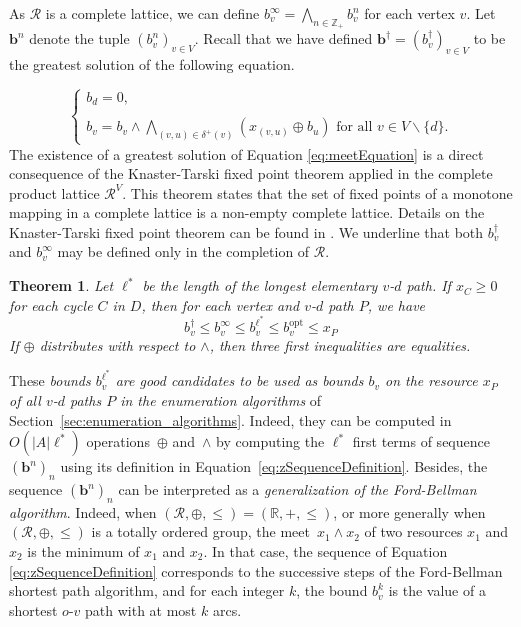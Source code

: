 \documentclass[11pt]{amsart}
\theoremstyle{plain}
\newtheorem{theo}{Theorem}
\theoremstyle{remark}
\newcommand{\rplus}{\oplus}
\newcommand{\rleq}{\leqslant}
\newcommand{\rgeq}{\geqslant}
\newcommand{\rset}{\mathcal{R}}
\newcommand{\re}{x}
\newcommand{\meet}{\wedge} \newcommand{\bigmeet}{\bigwedge}
\begin{document}
As $\rset$ is a complete lattice, we can define $b_{v}^{\infty} = \displaystyle \bigmeet_{n \in \mathbb{Z}_{+}}b_{v}^{n}$ for each vertex $v$. Let $\mathbf{b}^{n}$ denote the tuple $(b_{v}^{n})_{v\in V}$. Recall that we have defined $\mathbf{b^{\dagger}}= (b_{v}^{\dagger})_{v\in V}$ to be the greatest solution of the following equation.

\begin{equation}\label{eq:meetEquation}
	\left\{\begin{array}{l}
	b_{d} = 0, \\
\\
	b_{v} = \displaystyle b_{v}\meet \bigmeet_{(v,u)\in \delta^{+}(v)}(\re_{(v,u)} \rplus b_{u}) \text{ for all } v\in V\backslash \{d\}.
	\end{array}
	\right.
\end{equation}
\noindent The existence of a greatest solution of Equation \eqref{eq:meetEquation} is a direct consequence of the Knaster-Tarski fixed point theorem applied in the complete product lattice $\rset^{V}$. This theorem states that the set of fixed points of a monotone mapping in a complete lattice is a non-empty complete lattice. Details on the Knaster-Tarski fixed point theorem can be found in \cite{davey2002introduction}. We underline that both $b_{v}^{\dagger}$ and $b_{v}^{\infty}$ may be defined only in the completion of $\rset$.  


\begin{theo}\label{theo:relationsBetweenBounds}
Let $\ell^{*}$ be the length of the longest elementary $v$-$d$ path. If $\re_{C} \rgeq 0$ for each cycle $C$ in $D$, then for each vertex and $v$-$d$ path $P$, we have
\begin{equation}\label{eq:relationsBetweenBounds}
	b_{v}^{\dagger} \rleq b_{v}^{\infty} \rleq b_{v}^{\ell^{*}} \rleq b_{v}^{\mathrm{opt}} \rleq \re_{P}
\end{equation}
If $\rplus$ distributes with respect to $\meet$,  then three first inequalities are equalities.
\end{theo}

These \emph{bounds $b_{v}^{\ell^{*}}$ are good candidates to be used as bounds $b_{v}$ on the resource $\re_{P}$ of all $v$-$d$ paths $P$ in the enumeration algorithms }of Section~\ref{sec:enumeration_algorithms}. Indeed, they can be computed in $O(|A|\ell^{*})$ operations~$\rplus$ and~$\meet$ by computing the $\ell^{*}$ first terms of sequence $\left(\mathbf{b}^{n}\right)_{n}$ using its definition in Equation~\eqref{eq:zSequenceDefinition}. Besides, the sequence $\left(\mathbf{b}^{n}\right)_{n}$ can be interpreted as a \emph{generalization of the Ford-Bellman algorithm}. Indeed, when $(\rset, \rplus, \rleq) = (\mathbb{R}, +, \leq)$, or more generally when $(\rset, \rplus, \rleq) $ is a totally ordered group, the meet~$\re_{1}\meet \re_{2}$ of two resources $\re_{1}$ and $\re_{2}$ is the minimum of $\re_{1}$ and $\re_{2}$. In that case, the sequence of Equation \eqref{eq:zSequenceDefinition} corresponds to the successive steps of the Ford-Bellman shortest path algorithm, and for each integer $k$, the bound $b_{v}^{k}$ is the value of a shortest $o$-$v$ path with at most $k$ arcs. 
\end{document}
